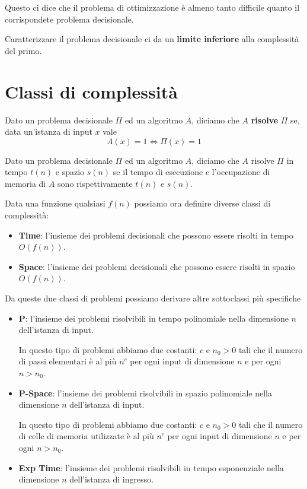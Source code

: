 Questo ci dice che il problema di ottimizzazione \`e almeno tanto difficile quanto il corrispondete problema decisionale.

Caratterizzare il problema decisionale ci da un \textbf{limite inferiore} alla complessit\`a del primo.

\section{Classi di complessit\`a}\label{classi}

\begin{theorem}
	Dato un problema decisionale $\Pi$ ed un algoritmo $A$, diciamo che $A$ \textbf{risolve} $\Pi$ se, data un'istanza di
	input $x$ vale
	\[ A(x) = 1 \Leftrightarrow \Pi(x) = 1 \]
\end{theorem}

\begin{theorem}
	Dato un problema decisionale $\Pi$ ed un algoritmo $A$, diciamo che $A$ risolve $\Pi$ in tempo $t(n)$ e spazio
	$s(n)$ se il tempo di esecuzione e l'occupazione di memoria di $A$ sono rispettivamente $t(n)$ e $s(n)$.
\end{theorem}

Data una funzione qualsiasi $f(n)$ possiamo ora definire diverse classi di complessit\`a:
\begin{itemize}
	\item \textbf{Time}: l'insieme dei problemi decisionali che possono essere risolti in tempo $O(f(n))$.
	\item \textbf{Space}: l'insieme dei problemi decisionali che possono essere risolti in spazio $O(f(n))$.
\end{itemize}
Da queste due classi di problemi possiamo derivare altre sottoclassi pi\`u specifiche
\begin{itemize}
	\item \textbf{P}: l'insieme dei problemi risolvibili in tempo polinomiale nella dimensione $n$ dell'istanza di input.

	      In questo tipo di problemi abbiamo due costanti: $c$ e $n_0 > 0$ tali che il numero di passi elementari \`e al
	      pi\`u $n^c$ per ogni input di dimensione $n$ e per ogni $n > n_0$.

	\item \textbf{P-Space}: l'insieme dei problemi risolvibili in spazio polinomiale nella dimensione $n$ dell'istanza
	      di input.

	      In questo tipo di problemi abbiamo due costanti: $c$ e $n_0 > 0$ tali che il numero di celle di memoria
	      utilizzate \`e al pi\`u $n^c$ per ogni input di dimensione $n$ e per ogni $n > n_0$.
	\item \textbf{Exp Time}: l'insieme dei problemi risolvibili in tempo esponenziale nella dimensione $n$ dell'istanza
	      di ingresso.
\end{itemize}

